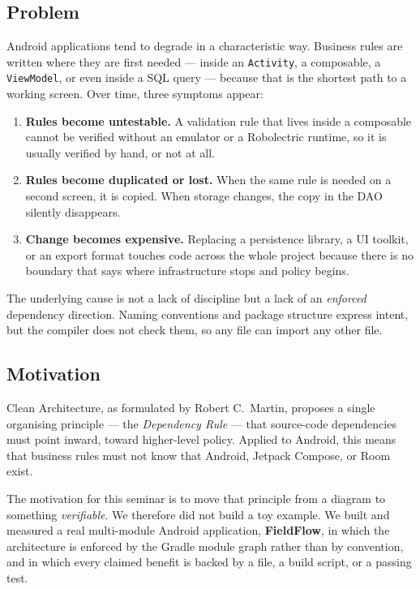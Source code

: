 \documentclass[11pt,a4paper]{article}
\begin{document}
\subsection{Problem}

Android applications tend to degrade in a characteristic way. Business rules
are written where they are first needed --- inside an \texttt{Activity}, a
composable, a \texttt{ViewModel}, or even inside a SQL query --- because that is
the shortest path to a working screen. Over time, three symptoms appear:

\begin{enumerate}[leftmargin=*]
  \item \textbf{Rules become untestable.} A validation rule that lives inside a
        composable cannot be verified without an emulator or a Robolectric
        runtime, so it is usually verified by hand, or not at all.
  \item \textbf{Rules become duplicated or lost.} When the same rule is needed
        on a second screen, it is copied. When storage changes, the copy in the
        DAO silently disappears.
  \item \textbf{Change becomes expensive.} Replacing a persistence library, a UI
        toolkit, or an export format touches code across the whole project
        because there is no boundary that says where infrastructure stops and
        policy begins.
\end{enumerate}

The underlying cause is not a lack of discipline but a lack of an
\emph{enforced} dependency direction. Naming conventions and package structure
express intent, but the compiler does not check them, so any file can import any
other file.

\subsection{Motivation}

Clean Architecture, as formulated by Robert C.\ Martin, proposes a single
organising principle --- the \emph{Dependency Rule} --- that source-code
dependencies must point inward, toward higher-level policy. Applied to Android,
this means that business rules must not know that Android, Jetpack Compose, or
Room exist.

The motivation for this seminar is to move that principle from a diagram to
something \emph{verifiable}. We therefore did not build a toy example. We built
and measured a real multi-module Android application, \textbf{FieldFlow}, in
which the architecture is enforced by the Gradle module graph rather than by
convention, and in which every claimed benefit is backed by a file, a build
script, or a passing test.
\end{document}
